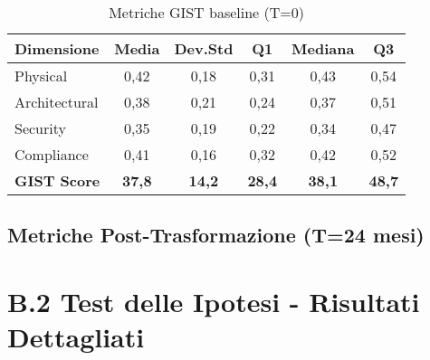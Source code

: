 \begin{table}[htbp]
\centering
\caption{Metriche GIST baseline (T=0)}
\label{tab:metriche_baseline}
\begin{tabular}{lccccc}
\toprule
\textbf{Dimensione} & \textbf{Media} & \textbf{Dev.Std} & \textbf{Q1} & \textbf{Mediana} & \textbf{Q3} \\
\midrule
Physical & 0,42 & 0,18 & 0,31 & 0,43 & 0,54 \\
Architectural & 0,38 & 0,21 & 0,24 & 0,37 & 0,51 \\
Security & 0,35 & 0,19 & 0,22 & 0,34 & 0,47 \\
Compliance & 0,41 & 0,16 & 0,32 & 0,42 & 0,52 \\
\midrule
\textbf{GIST Score} & \textbf{37,8} & \textbf{14,2} & \textbf{28,4} & \textbf{38,1} & \textbf{48,7} \\
\bottomrule
\end{tabular}
\end{table}

\subsection{\texorpdfstring{\textbf{Metriche Post-Trasformazione (T=24 mesi)}}{Metriche Post-Trasformazione (T=24 mesi)}}

\begin{table}[htbp]
\centering
\caption{Metriche GIST post-trasformazione e variazioni percentuali}
\label{tab:metriche_post}
\end{table}

\section{\texorpdfstring{\textbf{B.2 Test delle Ipotesi - Risultati Dettagliati}}{B.2 - Test delle Ipotesi - Risultati Dettagliati}}


